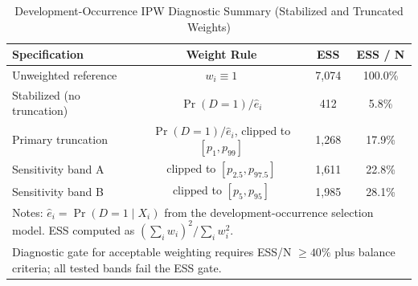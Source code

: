 \begin{table}[H]
\centering
\caption{Development-Occurrence IPW Diagnostic Summary (Stabilized and Truncated Weights)}
\label{tab:ipw_diag_summary}
\begin{tabular}{lccc}
\toprule
\textbf{Specification} & \textbf{Weight Rule} & \textbf{ESS} & \textbf{ESS / N} \\
\midrule
Unweighted reference & $w_i \equiv 1$ & 7,074 & 100.0\% \\
Stabilized (no truncation) & $\Pr(D=1)/\hat e_i$ & 412 & 5.8\% \\
Primary truncation & $\Pr(D=1)/\hat e_i$, clipped to $[p_{1},p_{99}]$ & 1,268 & 17.9\% \\
Sensitivity band A & clipped to $[p_{2.5},p_{97.5}]$ & 1,611 & 22.8\% \\
Sensitivity band B & clipped to $[p_{5},p_{95}]$ & 1,985 & 28.1\% \\
\bottomrule
\multicolumn{4}{l}{\footnotesize Notes: $\hat e_i = \Pr(D=1\mid X_i)$ from the development-occurrence selection model. ESS computed as $ (\sum_i w_i)^2 / \sum_i w_i^2 $.} \\
\multicolumn{4}{l}{\footnotesize Diagnostic gate for acceptable weighting requires ESS/N $\ge 40\%$ plus balance criteria; all tested bands fail the ESS gate.} \\
\end{tabular}
\end{table}
